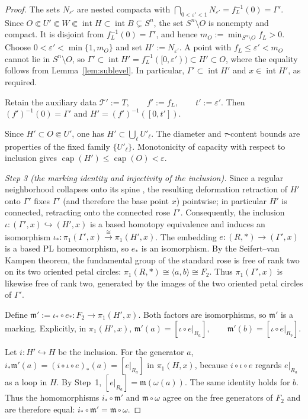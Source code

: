 \documentclass[12pt,oneside,a4paper]{article}
\theoremstyle{mytheorem}
\theoremstyle{remark}
\theoremstyle{definition}
\begin{document}
\begin{proof}
The sets $N_{\varepsilon'}$ are
nested compacta with
$\bigcap_{0<\varepsilon'<1}N_{\varepsilon'}=f_L^{-1}(0)=\Gamma'$.
Since
$O\Subset U'\Subset W\Subset\operatorname{int}H
 \subset\operatorname{int}B\subsetneq S^n$,
the set $S^n\setminus O$ is nonempty and compact.  It is disjoint from
$f_L^{-1}(0)=\Gamma'$, and hence
$m_O:=\min_{S^n\setminus O}f_L>0$.  Choose
$0<\varepsilon'<\min\{1,m_O\}$ and set $H':=N_{\varepsilon'}$.  A
point with $f_L\le\varepsilon'<m_O$ cannot lie in $S^n\setminus O$, so
\(\Gamma'\subset\operatorname{int}H'
=f_L^{-1}([0,\varepsilon'))\subset H'\subset O\),
where the equality follows from Lemma~\ref{lem:sublevel}.  In particular,
$\Gamma'\subset\operatorname{int}H'$ and $x\in\operatorname{int}H'$, as
required.

Retain the auxiliary data
$\mathcal{T}':=T,\qquad f':=f_L,\qquad t':=\varepsilon'.$
Then $(f')^{-1}(0)=\Gamma'$ and
$H'=(f')^{-1}([0,t'])$.

Since $H'\subset O\Subset U'$, one has
$H'\subset\bigcup_\ell U'_\ell$.  The diameter and $\tau$-content bounds
are properties of the fixed family $\{U'_\ell\}$.  Monotonicity of
capacity with respect to inclusion gives
$\operatorname{cap}(H')\leq\operatorname{cap}(O)<\varepsilon$.

\smallskip\noindent\emph{Step 3 (the marking identity and injectivity of the inclusion).}
Since a regular neighborhood collapses onto its spine
\cite[Theorem~3.16]{zbMATH01714503}, the resulting deformation retraction of $H'$
onto $\Gamma'$ fixes $\Gamma'$ (and therefore the base point $x$) pointwise;
in particular $H'$ is connected, retracting onto the connected rose
$\Gamma'$.  Consequently, the inclusion
$\iota:(\Gamma',x)\hookrightarrow(H',x)$ is a based homotopy equivalence
and induces an isomorphism
$\iota_*:\pi_1(\Gamma',x)\xrightarrow{\cong}\pi_1(H',x)$.
The embedding $e:(R,*)\to(\Gamma',x)$ is a based PL homeomorphism, so
$e_*$ is an isomorphism.  By the Seifert--van Kampen theorem, the
fundamental group of the standard rose is free of rank two on its two
oriented petal circles:
$\pi_1(R,*) \cong \langle a,b \rangle \cong F_2.$
Thus $\pi_1(\Gamma',x)$ is likewise free of rank two, generated by the
images of the two oriented petal circles of $\Gamma'$.

Define
$\mathfrak{m}':=\iota_*\circ e_*:F_2\to\pi_1(H',x)$.
Both factors are isomorphisms, so $\mathfrak{m}'$ is a marking.  Explicitly, in
$\pi_1(H',x)$,
$\mathfrak{m}'(a) = [\iota \circ e|_{R_a}], \qquad
\mathfrak{m}'(b) = [\iota \circ e|_{R_b}].$


Let $i:H'\hookrightarrow H$ be the inclusion.  For the generator $a$,
\(i_* \mathfrak{m}'(a) = (i \circ \iota \circ e)_*(a) = [e|_{R_a}]\)
in $\pi_1(H,x)$, because $i\circ\iota\circ e$ regards $e|_{R_a}$ as a
loop in $H$.  By Step~1,
$[e|_{R_a}]=\mathfrak{m}(\omega(a))$.  The same identity holds for $b$.  Thus the
homomorphisms $i_*\circ\mathfrak{m}'$ and $\mathfrak{m}\circ\omega$ agree on the free
generators of $F_2$ and are therefore equal:
\(i_* \circ \mathfrak{m}' = \mathfrak{m} \circ \omega\).


\end{proof}
\end{document}
